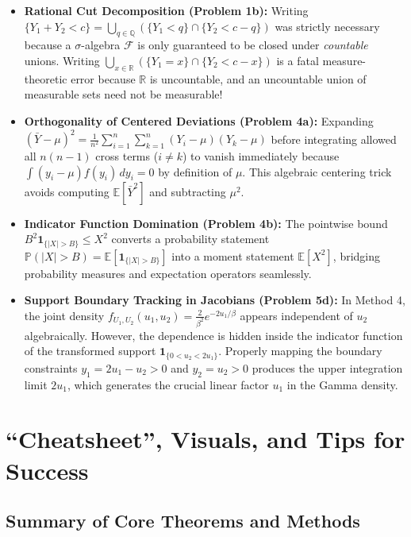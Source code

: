 \documentclass[11pt, letterpaper]{article}
\theoremstyle{definition}
\theoremstyle{remark}
\newcommand{\R}{\mathbb{R}}
\newcommand{\Q}{\mathbb{Q}}
\newcommand{\E}{\mathbb{E}}
\newcommand{\Prob}{\mathbb{P}}
\newcommand{\F}{\mathcal{F}}
\begin{document}
\begin{itemize}
    \item \textbf{Rational Cut Decomposition (Problem 1b):} Writing $\{Y_1 + Y_2 < c\} = \bigcup_{q \in \Q} (\{Y_1 < q\} \cap \{Y_2 < c - q\})$ was strictly necessary because a $\sigma$-algebra $\F$ is only guaranteed to be closed under \emph{countable} unions. Writing $\bigcup_{x \in \R} (\{Y_1 = x\} \cap \{Y_2 < c - x\})$ is a fatal measure-theoretic error because $\R$ is uncountable, and an uncountable union of measurable sets need not be measurable!
    \item \textbf{Orthogonality of Centered Deviations (Problem 4a):} Expanding $(\bar{Y} - \mu)^2 = \frac{1}{n^2}\sum_{i=1}^n\sum_{k=1}^n (Y_i - \mu)(Y_k - \mu)$ before integrating allowed all $n(n-1)$ cross terms ($i \neq k$) to vanish immediately because $\int (y_i - \mu)f(y_i)\,dy_i = 0$ by definition of $\mu$. This algebraic centering trick avoids computing $\E[\bar{Y}^2]$ and subtracting $\mu^2$.
    \item \textbf{Indicator Function Domination (Problem 4b):} The pointwise bound $B^2 \mathbf{1}_{\{|X| > B\}} \le X^2$ converts a probability statement $\Prob(|X| > B) = \E[\mathbf{1}_{\{|X| > B\}}]$ into a moment statement $\E[X^2]$, bridging probability measures and expectation operators seamlessly.
    \item \textbf{Support Boundary Tracking in Jacobians (Problem 5d):} In Method 4, the joint density $f_{U_1, U_2}(u_1, u_2) = \frac{2}{\beta^2}e^{-2u_1/\beta}$ appears independent of $u_2$ algebraically. However, the dependence is hidden inside the indicator function of the transformed support $\mathbf{1}_{\{0 < u_2 < 2u_1\}}$. Properly mapping the boundary constraints $y_1 = 2u_1 - u_2 > 0$ and $y_2 = u_2 > 0$ produces the upper integration limit $2u_1$, which generates the crucial linear factor $u_1$ in the Gamma density.
\end{itemize}

\newpage

\section{``Cheatsheet'', Visuals, and Tips for Success}

\subsection{Summary of Core Theorems and Methods}
\end{document}
